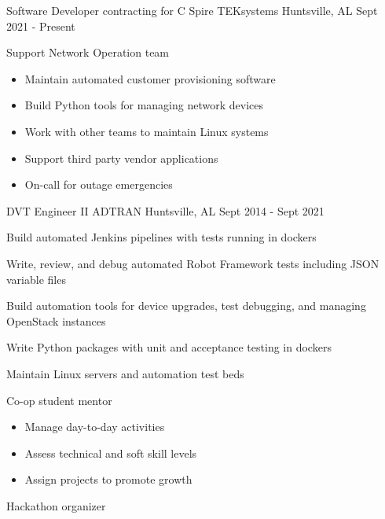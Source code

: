 
\begin{cventries}
  \cventry
    {Software Developer contracting for C Spire} %
    {TEKsystems } %
    {Huntsville, AL} %
    {Sept 2021 - Present} %
    {
      \begin{cvitems} %
        \item {Support Network Operation team}
            \begin{itemize}
                \item {Maintain automated customer provisioning software}
                \item {Build Python tools for managing network devices}
                \item {Work with other teams to maintain Linux systems}
                \item {Support third party vendor applications}
                \item {On-call for outage emergencies}
            \end{itemize}
      \end{cvitems}
    }

  \cventry
    {DVT Engineer II} %
    {ADTRAN} %
    {Huntsville, AL} %
    {Sept 2014 - Sept 2021} %
    {
      \begin{cvitems} %
        \item {Build automated Jenkins pipelines with tests running in dockers}
        \item {Write, review, and debug automated Robot Framework tests including JSON variable files}
        \item {Build automation tools for device upgrades, test debugging, and managing OpenStack instances}
        \item {Write Python packages with unit and acceptance testing in dockers}
        \item {Maintain Linux servers and automation test beds}
        \item {Co-op student mentor}
            \begin{itemize}
                \item {Manage day-to-day activities}
                \item {Assess technical and soft skill levels}
                \item {Assign projects to promote growth}
            \end{itemize}
        \item {Hackathon organizer}
      \end{cvitems}
    }


\end{cventries}
